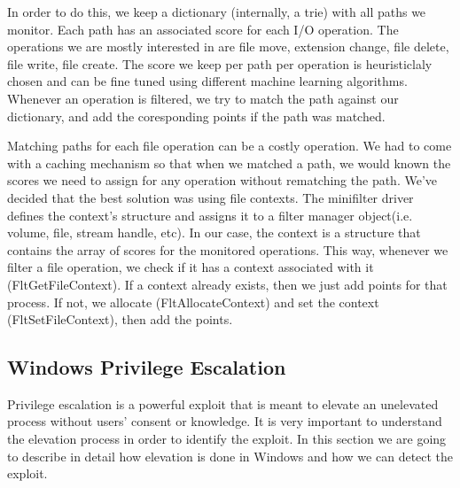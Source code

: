 \documentclass[conference]{IEEEtran}
\begin{document}
    \par{}
    In order to do this, we keep a dictionary (internally, a trie) with all paths we monitor. Each path has an associated score for each I/O
    operation. The operations we are mostly interested in are file move, extension change, file delete, file write, file create. The score we
    keep per path per operation is heuristiclaly chosen and can be fine tuned using different machine learning algorithms. Whenever an operation
    is filtered, we try to match the path against our dictionary, and add the coresponding points if the path was matched.\\

    \par{}
    Matching paths for each file operation can be a costly operation. We had to come with a caching mechanism so that when we matched a path,
    we would known the scores we need to assign for any operation without rematching the path. We've decided that the best solution was using
    file contexts. The minifilter driver defines the context's structure and assigns it to a filter manager object(i.e. volume, file, stream handle,
    etc). In our case, the context is a structure that contains the array of scores for the monitored operations. This way, whenever we filter a
    file operation, we check if it has a context associated with it (FltGetFileContext). If a context already exists, then we just add points for that process. If not,
    we allocate (FltAllocateContext) and set the context (FltSetFileContext), then add the points.


    \subsection{Windows Privilege Escalation}
    Privilege escalation is a powerful exploit that is meant to elevate an unelevated process without users' consent or knowledge. It is very
    important to understand the elevation process in order to identify the exploit. In this section we are going to describe in detail how
    elevation is done in Windows and how we can detect the exploit.\\
\end{document}
